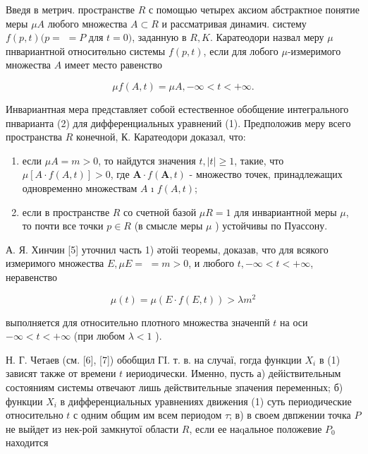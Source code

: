 \documentclass[10pt]{article}
\begin{document}
Введя в метрич. пространстве $R$ с помощью четырех аксиом абстрактное понятие меры $\mu A$ любого множества $A \subset R$ и рассматривая динамич. систему $f(p, t)(p=$ $=P$ для $t=0)$, заданную в $R, K$. Каратеодори назвал меру $\mu$ пнвариантной относитөльно системы $f(p, t)$, если для лобого $\mu$-измеримого множества $A$ имеет место равенство



\[

\mu f(A, t)=\mu A,-\infty<t<+\infty .

\]



Инвариантная мера представляет собой естественное обобщение интегрального пнварианта (2) для дифференциальных уравнений (1). Предположив меру всего пространства $R$ конечной, К. Каратеодори доказал, что:



\begin{enumerate}

  \item если $\mu A=m>0$, то найдутся значения $t,|t| \geqslant 1$, такие, что $\mu[A \cdot f(A, t)]>0$, где $\boldsymbol{A} \cdot f(\boldsymbol{A}, t)$ - множество точек, принадлежащих одновременно множествам $A$ ı $f(A, t)$;



  \item если в пространстве $R$ со счетной базой $\mu R=1$ для инвариантной меры $\mu$, то почти все точки $p \in R$ (в смысле меры $\mu$ ) устойчивы по Пуассону.



\end{enumerate}



А. Я. Хинчин [5] уточнил часть 1) әтойі теоремы, доказав, что для всякого измеримого множества $E, \mu E=$ $=m>0$, и любого $t,-\infty<t<+\infty$, неравенство



\[

\mu(t)=\mu(E \cdot f(E, t))>\lambda m^{2}

\]



выполняется для относительно плотного множества значенпй $t$ на оси $-\infty<t<+\infty$ (при любом $\lambda<1$ ).



Н. Г. Четаев (см. [6], [7]) обобщил ГI. т. в. на случаї, гогда функции $X_{i}$ в (1) зависят также от времени $t$ иериодически. Именно, пусть а) дейіствительным состояниям системы отвечают лишь действительные зпачения переменных; б) функции $X_{i}$ в дифференциальных уравнениях движения (1) суть периодические относительно $t$ с одним общим им всем периодом $\tau$; в) в своем двпжении точка $P$ не выйдет из нек-рой замкнутої области $R$, если ее наqальное положевие $P_{0}$ находится
\end{document}
